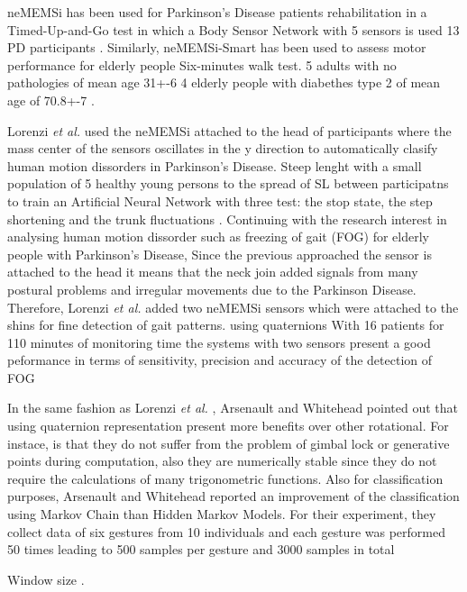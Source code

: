 \documentclass[12pt,journal,onecolumn,compsoc]{IEEEtran}
\begin{document}
neMEMSi has been used for Parkinson's Disease patients rehabilitation 
in a Timed-Up-and-Go test in which a Body Sensor Network with 5 sensors is used 
13 PD participants \cite{Caldara2014}.
Similarly, neMEMSi-Smart has been used to assess motor performance for elderly people
Six-minutes walk test.
5 adults with no pathologies of mean age 31+-6
4 elderly people with diabethes type 2  of mean age of 70.8+-7 
\cite{Caldara2015}.


Lorenzi \textit{et al.} used the neMEMSi 
attached to the head of participants 
where the mass center of the sensors oscillates in the y direction
to automatically clasify human motion dissorders in Parkinson's Disease.
Steep lenght with a small population of 5 healthy young persons
to 
the spread of SL between participatns 
to train an Artificial Neural Network 
with three test: the stop state, the step shortening and
the trunk fluctuations \cite{Lorenzi2015}.
Continuing with the research interest 
in analysing human motion dissorder 
such as freezing of gait (FOG)
for elderly people with Parkinson's Disease,
Since the previous approached the sensor is attached to the head
it means that the neck join added signals from many postural problems
and irregular movements due to the Parkinson Disease.
Therefore, Lorenzi \textit{et al.} 
added two neMEMSi sensors which were attached to the shins
for fine detection of gait patterns.
using quaternions 
With 16 patients for 110 minutes of monitoring time 
the systems with two sensors
present a good peformance in terms of sensitivity, precision and accuracy of 
the detection of FOG  \cite{Lorenzi2016}


In the same fashion as Lorenzi \textit{et al.} \cite{Lorenzi2016}, Arsenault and Whitehead 
pointed out that using quaternion representation present more benefits over other rotational.
For instace, is that they do not suffer from the problem of gimbal lock
or generative points during computation, also they are numerically stable 
since they do not require the calculations of many trigonometric functions.
Also for classification purposes, Arsenault and Whitehead 
reported an improvement of the classification using
Markov Chain than Hidden Markov Models.
For their experiment, they collect data 
of six gestures from 10 individuals and each gesture was performed 50 times 
leading to 500 samples per gesture and 3000 samples in total \cite{Arsenault2015_a, Arsenault2015_b}

 
 
 
Window size \cite{Banos2014}. 
\end{document}
